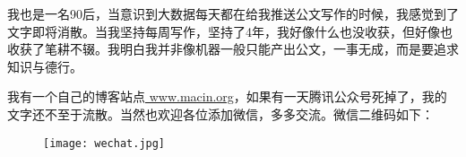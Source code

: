 \documentclass[fontset=fandol,12pt,a5paper]{ctexbook}
\begin{document}
我也是一名90后，当意识到大数据每天都在给我推送公文写作的时候，我感觉到了文字即将消散。当我坚持每周写作，坚持了4年，我好像什么也没收获，但好像也收获了笔耕不辍。我明白我并非像机器一般只能产出公文，一事无成，而是要追求知识与德行。

我有一个自己的博客站点\href{https://www.macin.org/}{ www.macin.org}，如果有一天腾讯公众号死掉了，我的文字还不至于流散。当然也欢迎各位添加微信，多多交流。微信二维码如下：

\begin{figure}[htbp] %
\centering %
\texttt{[image: wechat.jpg]} %
\end{figure}
\end{document}
